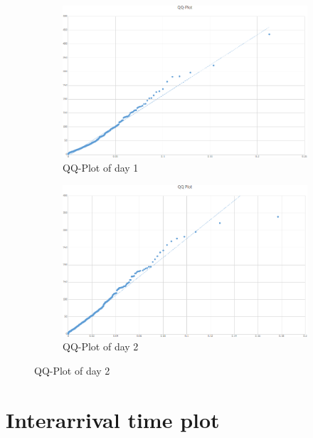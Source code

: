 \documentclass{article}
\begin{document}
\begin{figure}[H]
    \begin{subfigure}{0.5\textwidth}
        \includegraphics[width=\linewidth]{day1-qqplot.png}
        \caption{QQ-Plot of day 1}
    \end{subfigure}
    \begin{subfigure}{0.5\textwidth}
        \includegraphics[width=\linewidth]{day2-qqplot.png}
        \caption{QQ-Plot of day 2}
    \end{subfigure}
\end{figure}


\section{Interarrival time plot}
\end{document}
